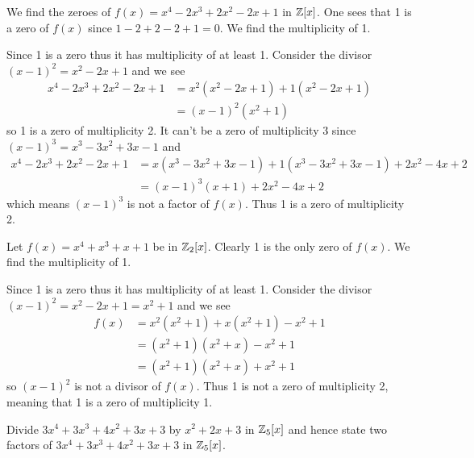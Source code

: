 \begin{example}
    We find the zeroes of $f(x) = x^4 - 2x^3 + 2x^2 - 2x + 1$ in $\mathbb{Z}[x]$. One sees that 1 is a zero of $f(x)$ since $1 - 2 + 2 - 2 + 1 = 0$. We find the multiplicity of 1.

    Since 1 is a zero thus it has multiplicity of at least 1. Consider the divisor $(x-1)^2 = x^2 - 2x + 1$ and we see
    \begin{align*}
        x^4 - 2x^3 + 2x^2 - 2x + 1 &= x^2(x^2 - 2x + 1) + 1(x^2 - 2x + 1)\\
        &= (x-1)^2(x^2+1)
    \end{align*}
    so 1 is a zero of multiplicity 2. It can't be a zero of multiplicity 3 since $(x-1)^3 = x^3 - 3x^2 + 3x - 1$ and
    \begin{align*}
        x^4 - 2x^3 + 2x^2 - 2x + 1 &= x(x^3 - 3x^2 + 3x - 1) + 1(x^3 - 3x^2 + 3x - 1) + 2x^2 - 4x + 2\\
        &= (x-1)^3(x+1) + 2x^2 - 4x + 2
    \end{align*}
    which means $(x-1)^3$ is not a factor of $f(x)$. Thus 1 is a zero of multiplicity 2.
\end{example}

\begin{example}
    Let $f(x) = x^4 + x^3 + x + 1$ be in $\mathbb{Z}_2[x]$. Clearly 1 is the only zero of $f(x)$. We find the multiplicity of 1.

    Since 1 is a zero thus it has multiplicity of at least 1. Consider the divisor $(x-1)^2 = x^2 - 2x + 1 = x^2 + 1$ and we see
    \begin{align*}
        f(x) &= x^2(x^2+1) + x(x^2+1) - x^2 + 1\\
        &= (x^2+1)(x^2+x) - x^2 + 1\\
        &= (x^2+1)(x^2+x) + x^2 + 1
    \end{align*}
    so $(x-1)^2$ is not a divisor of $f(x)$. Thus 1 is not a zero of multiplicity 2, meaning that 1 is a zero of multiplicity 1.
\end{example}

\begin{exercise}
    Divide $3x^4 + 3x^3 + 4x^2 + 3x + 3$ by $x^2 + 2x + 3$ in $\mathbb{Z}_5[x]$ and hence state two factors of $3x^4 + 3x^3 + 4x^2 + 3x + 3$ in $\mathbb{Z}_5[x]$.
\end{exercise}

